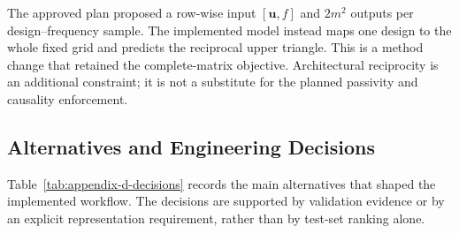 The approved plan proposed a row-wise input $[\mathbf u,f]$ and $2m^2$ outputs
per design--frequency sample. The implemented model instead maps one design to
the whole fixed grid and predicts the reciprocal upper triangle. This is a
method change that retained the complete-matrix objective. Architectural
reciprocity is an additional constraint; it is not a substitute for the
planned passivity and causality enforcement.

\subsection{Alternatives and Engineering Decisions}
Table~\ref{tab:appendix-d-decisions} records the main alternatives that shaped
the implemented workflow. The decisions are supported by validation evidence
or by an explicit representation requirement, rather than by test-set ranking
alone.


